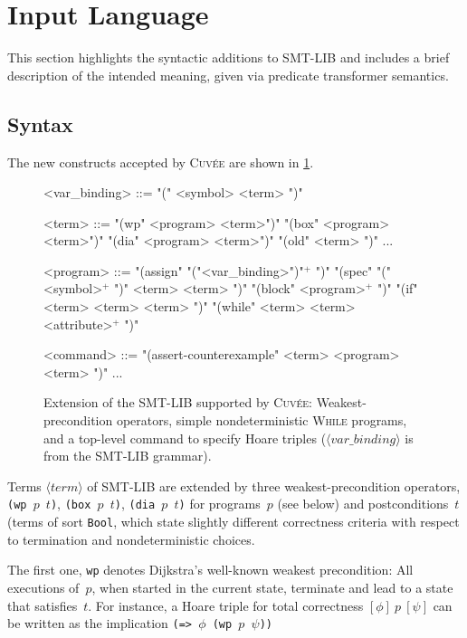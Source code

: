 \documentclass[fleqn]{llncs}
\newcommand{\Cuvee}{\textsc{Cuvée}\xspace}
\newcommand{\code}[1]{\texttt{#1}}
\newcommand{\hoaretotal}[3]{[ #1 ]~#2~[ #3 ]}
\newcommand{\nonterminal}[1]{\ensuremath{\langle \mathit{#1} \rangle}}
\begin{document}
\section{Input Language}
\label{sec:language}

This section highlights the syntactic additions to SMT-LIB and includes a brief description of the intended meaning,
given via predicate transformer semantics.

\subsection{Syntax}
\label{sec:syntax}

The new constructs accepted by \Cuvee are shown in \cref{fig:syntax}.

\begin{figure}[t]
    \begin{grammar}
    <var_binding>
        ::= "(" <symbol> <term> ")"

    <term>
        ::=  "(wp" <program> <term>")"
        \alt "(box" <program> <term>")"
        \alt "(dia" <program> <term>")"
        \alt "(old" <term> ")"
        \alt ...

    <program>
        ::=  "(assign" "("<var_binding>")"$^+$ ")"
        \alt "(spec"   "(" <symbol>$^+$ ")" <term> <term> ")"
        \alt "(block"  <program>$^+$ ")"
        \alt "(if"     <term> <term> <term> ")"
        \alt "(while"  <term> <term> <attribute>$^+$ ")"

    <command>
        ::=  "(assert-counterexample" <term> <program> <term> ")"
        \alt ...
    \end{grammar}
    \caption{Extension of the SMT-LIB supported by \Cuvee:
             Weakest-precondition operators,
             simple nondeterministic \textsc{While} programs,
             and a top-level command to specify Hoare triples
             (\nonterminal{var\_binding} is from the SMT-LIB grammar).}
    \label{fig:syntax}
\end{figure}

Terms \nonterminal{term} of SMT-LIB are extended by three weakest-precondition operators,
\code{(wp  $p$ $t$)}, \code{(box $p$ $t$)}, \code{(dia $p$ $t$)}
for programs~$p$ (see below)
and postconditions~$t$ (terms of sort \code{Bool},
which state slightly different correctness criteria with respect to termination and nondeterministic choices.

The first one, \code{wp} denotes Dijkstra's well-known weakest precondition:
All executions of~$p$, when started in the current state, terminate and lead to a state that satisfies~$t$.
For instance, a Hoare triple for total correctness $\hoaretotal{\phi}{p}{\psi}$ can be written as the implication \code{(=> $\phi$ (wp $p$ $\psi$))}
\end{document}
